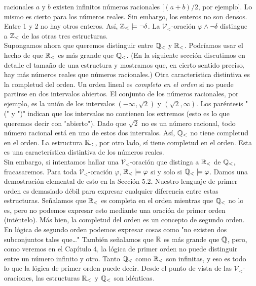 \documentclass[12pt,a4paper]{book}
\newcommand{\comillas}[1]{"#1"}
\newcommand{\VV}{\mathcal{V}}
\begin{document}
    racionales $a$ y $b$ existen infinitos números racionales [$(a+b)/2$, por ejemplo]. Lo mismo es cierto para los números
    reales. Sin embargo, los enteros no son densos. Entre 1 y 2 no hay otros enteros. Así, $\mathbb{Z}_{<}\models\neg\delta$. La
    $\VV_{<}$-oración $\varphi\wedge\neg\delta$ distingue a $\mathbb{Z}_{<}$ de las otras tres estructuras.\\
    Supongamos ahora que queremos distinguir entre $\mathbb{Q}_{<}$ y $\mathbb{R}_{<}$. Podríamos usar el hecho de que $\mathbb{R}_{<}$ es más
    grande que $\mathbb{Q}_{<}$. (En la siguiente sección discutimos en detalle el tamaño de una estructura y mostramos que, en
    cierto sentido preciso, hay más números reales que números racionales.) Otra característica distintiva es la
    completud del orden. Un orden lineal es \textit{completo en el orden} si no puede partirse en dos intervalos
    abiertos. El conjunto de los números racionales, por ejemplo, es la unión de los intervalos $(-\infty,\sqrt{2})$ y
    $(\sqrt{2},\infty)$. Los paréntesis \comillas{(} y \comillas{)} indican que los intervalos no contienen los extremos
    (esto es lo que queremos decir con \comillas{abierto}). Dado que $\sqrt{2}$ no es un número racional, todo número
    racional está en uno de estos dos intervalos. Así, $\mathbb{Q}_{<}$ no tiene completud en el orden. La estructura $\mathbb{R}_{<}$,
    por otro lado, sí tiene completud en el orden. Esta es una característica distintiva de los números reales.\\
    Sin embargo, si intentamos hallar una $\VV_{<}$-oración que distinga a $\mathbb{R}_{<}$ de $\mathbb{Q}_{<}$, fracasaremos. Para toda
    $\VV_{<}$-oración $\varphi$, $\mathbb{R}_{<}\models\varphi$ si y solo si $\mathbb{Q}_{<}\models\varphi$. Damos una demostración
    elemental de esto en la Sección 5.2. Nuestro lenguaje de primer orden es demasiado débil para expresar cualquier
    diferencia entre estas estructuras. Señalamos que $\mathbb{R}_{<}$ es completa en el orden mientras que $\mathbb{Q}_{<}$ no lo es, pero
    no podemos expresar esto mediante una oración de primer orden (inténtelo). Más bien, la completud del orden es un
    concepto de segundo orden. En lógica de segundo orden podemos expresar cosas como \comillas{no existen dos
    subconjuntos tales que\dots} También señalamos que $\mathbb{R}$ es más grande que $\mathbb{Q}$, pero, como veremos en el Capítulo 4, la
    lógica de primer orden no puede distinguir entre un número infinito y otro. Tanto $\mathbb{Q}_{<}$ como $\mathbb{R}_{<}$ son infinitas,
    y eso es todo lo que la lógica de primer orden puede decir. Desde el punto de vista de las $\VV_{<}$-oraciones, las
    estructuras $\mathbb{R}_{<}$ y $\mathbb{Q}_{<}$ son idénticas.
\end{document}

